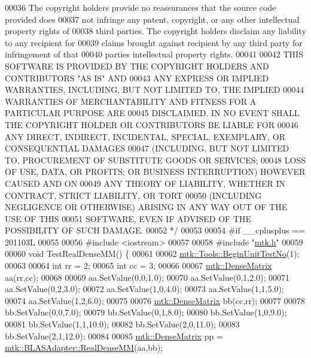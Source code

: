 \begin{DoxyCode}
00036 \textcolor{comment}{The copyright holders provide no reassurances that the source code provided does}
00037 \textcolor{comment}{not infringe any patent, copyright, or any other intellectual property rights of}
00038 \textcolor{comment}{third parties. The copyright holders disclaim any liability to any recipient for}
00039 \textcolor{comment}{claims brought against recipient by any third party for infringement of that}
00040 \textcolor{comment}{parties intellectual property rights.}
00041 \textcolor{comment}{}
00042 \textcolor{comment}{THIS SOFTWARE IS PROVIDED BY THE COPYRIGHT HOLDERS AND CONTRIBUTORS "AS IS" AND}
00043 \textcolor{comment}{ANY EXPRESS OR IMPLIED WARRANTIES, INCLUDING, BUT NOT LIMITED TO, THE IMPLIED}
00044 \textcolor{comment}{WARRANTIES OF MERCHANTABILITY AND FITNESS FOR A PARTICULAR PURPOSE ARE}
00045 \textcolor{comment}{DISCLAIMED. IN NO EVENT SHALL THE COPYRIGHT HOLDER OR CONTRIBUTORS BE LIABLE FOR}
00046 \textcolor{comment}{ANY DIRECT, INDIRECT, INCIDENTAL, SPECIAL, EXEMPLARY, OR CONSEQUENTIAL DAMAGES}
00047 \textcolor{comment}{(INCLUDING, BUT NOT LIMITED TO, PROCUREMENT OF SUBSTITUTE GOODS OR SERVICES;}
00048 \textcolor{comment}{LOSS OF USE, DATA, OR PROFITS; OR BUSINESS INTERRUPTION) HOWEVER CAUSED AND ON}
00049 \textcolor{comment}{ANY THEORY OF LIABILITY, WHETHER IN CONTRACT, STRICT LIABILITY, OR TORT}
00050 \textcolor{comment}{(INCLUDING NEGLIGENCE OR OTHERWISE) ARISING IN ANY WAY OUT OF THE USE OF THIS}
00051 \textcolor{comment}{SOFTWARE, EVEN IF ADVISED OF THE POSSIBILITY OF SUCH DAMAGE.}
00052 \textcolor{comment}{*/}
00053 
00054 \textcolor{preprocessor}{#if \_\_cplusplus == 201103L}
00055 
00056 \textcolor{preprocessor}{#include <iostream>}
00057 
00058 \textcolor{preprocessor}{#include "\hyperlink{mtk_8h}{mtk.h}"}
00059 
00060 \textcolor{keywordtype}{void} TestRealDenseMM() \{
00061 
00062   \hyperlink{classmtk_1_1Tools_afc29ecaf337a13ed2e817d3890a5a441}{mtk::Tools::BeginUnitTestNo}(1);
00063 
00064   \textcolor{keywordtype}{int} rr = 2;
00065   \textcolor{keywordtype}{int} cc = 3;
00066 
00067   \hyperlink{classmtk_1_1DenseMatrix}{mtk::DenseMatrix} aa(rr,cc);
00068 
00069   aa.SetValue(0,0,1.0);
00070   aa.SetValue(0,1,2.0);
00071   aa.SetValue(0,2,3.0);
00072   aa.SetValue(1,0,4.0);
00073   aa.SetValue(1,1,5.0);
00074   aa.SetValue(1,2,6.0);
00075 
00076   \hyperlink{classmtk_1_1DenseMatrix}{mtk::DenseMatrix} bb(cc,rr);
00077 
00078   bb.SetValue(0,0,7.0);
00079   bb.SetValue(0,1,8.0);
00080   bb.SetValue(1,0,9.0);
00081   bb.SetValue(1,1,10.0);
00082   bb.SetValue(2,0,11.0);
00083   bb.SetValue(2,1,12.0);
00084 
00085   \hyperlink{classmtk_1_1DenseMatrix}{mtk::DenseMatrix} pp = \hyperlink{classmtk_1_1BLASAdapter_acebd0e9bfe0bdd609c7fbea98ccfd3b5}{mtk::BLASAdapter::RealDenseMM}(aa,bb);

\end{DoxyCode}
